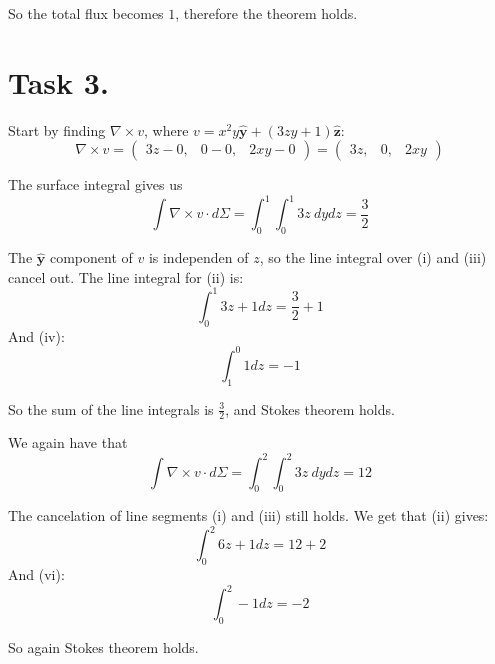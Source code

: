 \documentclass[a4paper,11pt]{article}
\begin{document}
So the total flux becomes $1$, therefore the theorem holds.

\section*{Task 3.}
Start by finding $\nabla \times v$, where $v = x^2 y \mathbf{\hat{y}} + (3zy + 1)\mathbf{\hat{z}}$:
\[
    \nabla \times v = \begin{pmatrix} 3z - 0, & 0 - 0, & 2xy - 0 \end{pmatrix} = \begin{pmatrix} 3z, & 0, & 2xy \end{pmatrix}
\]

\begin{alphalist}
    \item The surface integral gives us 
        \[
            \int \nabla \times v \cdot d\Sigma = \int_0^1 \int_0^1 3z\: dy dz = \frac{3}{2}
        \]

        The $\mathbf{\hat{y}}$ component of $v$ is independen of $z$, so the line integral over (i) and (iii) cancel out.
        The line integral for (ii) is:
        \[
            \int_0^1 3z + 1 dz = \frac{3}{2} + 1
        \]
        And (iv):
        \[
            \int_1^0 1 dz = -1
        \]

        So the sum of the line integrals is $\frac{3}{2}$, and Stokes theorem holds.

    \item We again have that
        \[
            \int \nabla \times v \cdot d\Sigma = \int_0^2 \int_0^2 3z\: dy dz = 12
        \]

        The cancelation of line segments (i) and (iii) still holds. We get that (ii) gives:
        \[
            \int_0^2 6z + 1 dz = 12 + 2
        \]
        And (vi):
        \[
            \int_0^2 -1 dz = -2
        \]

        So again Stokes theorem holds.
\end{alphalist}
\end{document}
